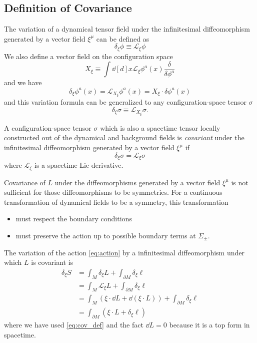 \documentclass[10pt]{article}
\begin{document}
\subsection{Definition of Covariance}
The variation of a dynamical tensor field under the infinitesimal diffeomorphism generated by a vector field $\xi^\mu$ can be defined as
\begin{equation}
    \delta_{\xi}\phi\equiv\mathcal{L}_\xi \phi
\end{equation}
We also define a vector field on the configuration space
\begin{equation}
    X_\xi\equiv\int\dd[d]{x}\mathcal{L}_\xi \phi^a(x)\frac{\delta}{\delta \phi^a}
\end{equation}
and we have
\begin{equation}
    \delta_\xi \phi^a(x)=\mathcal{L}_{X_\xi}\phi^a(x)=X_{\xi}\cdot\delta\phi^a(x)
\end{equation}
and this variation formula can be generalized to any configuration-space tensor $\sigma$
\begin{equation}
    \delta_\xi\sigma\equiv\mathcal{L}_{X_\xi}\sigma.
\end{equation}

\begin{definition}[Covariance]
    A configuration-space tensor $\sigma$ which is also a spacetime tensor locally constructed out of the dynamical and background fields is \textit{covariant} under the infinitesimal diffeomorphism generated by a vector field $\xi^\mu$ if
    \begin{equation}
        \delta_{\xi}\sigma=\mathcal{L}_\xi \sigma\label{eq:cov_def}
    \end{equation}
    where $\mathcal{L}_\xi$ is a spacetime Lie derivative.
\end{definition}

Covariance of $L$ under the diffeomorphisms generated by a vector field $\xi^\mu$ is not sufficient for those diffeomorphisms to be symmetries.
For a continuous transformation of dynamical fields to be a symmetry, this transformation
\begin{itemize}
    \item must respect the boundary conditions
    \item must preserve the action up to possible boundary terms at $\Sigma_\pm$.
\end{itemize}
The variation of the action \cref{eq:action} by a infinitesimal diffeomorphism under which $L$ is covariant is
\begin{equation}
    \begin{split}
        \delta_\xi S&=\int_M \delta_\xi L+\int_{\partial M}\delta_\xi \ell\\
        &=\int_M \mathcal{L}_\xi L+\int_{\partial M}\delta_\xi \ell\\
        &=\int_M \left(\xi\cdot\dd{L}+\dd(\xi\cdot L)\right)+\int_{\partial M}\delta_\xi \ell\\
        &=\int_{\partial M}\left(\xi\cdot L+\delta_{\xi}\ell\right)
    \end{split}
\end{equation}
where we have used \cref{eq:cov_def} and the fact $\dd{L}=0$ because it is a top form in spacetime.
\end{document}
